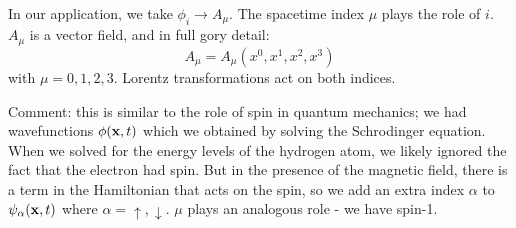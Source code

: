 In our application, we take $\phi_i \to A_\mu$. The spacetime index $\mu$ plays the role of $i$. $A_\mu$ is a vector field, and in full gory detail:
\begin{equation}
    A_\mu = A_\mu(x^0, x^1, x^2, x^3)
\end{equation}
with $\mu = 0, 1, 2, 3$. Lorentz transformations act on both indices.

Comment: this is similar to the role of spin in quantum mechanics; we had wavefunctions $\phi(\mathbf{x}, t)$ which we obtained by solving the Schrodinger equation. When we solved for the energy levels of the hydrogen atom, we likely ignored the fact that the electron had spin. But in the presence of the magnetic field, there is a term in the Hamiltonian that acts on the spin, so we add an extra index $\alpha$ to $\psi_{\alpha}(\mathbf{x}, t)$ where $\alpha = \uparrow, \downarrow$. $\mu$ plays an analogous role - we have spin-1.

